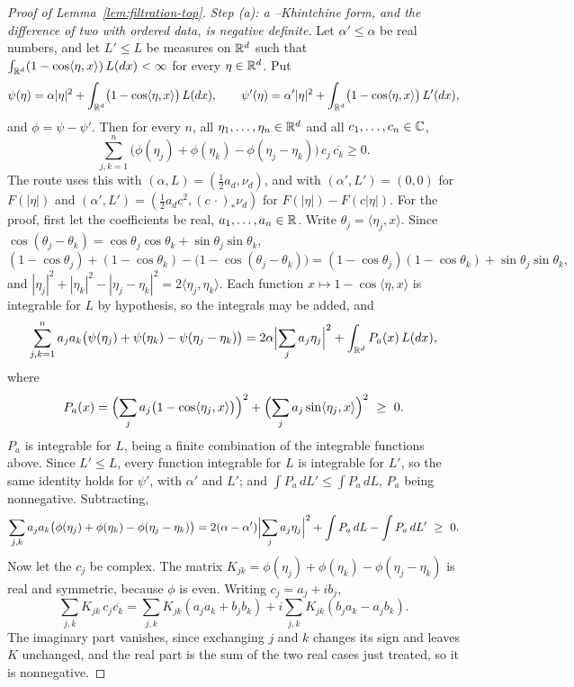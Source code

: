 \begin{proof}[Proof of Lemma~\ref{lem:filtration-top}]
\emph{Step (a): a \Levy--Khintchine form, and the difference of two with ordered data, is negative
definite.} Let $\alpha' \le \alpha$ be real numbers, and let $L' \le L$ be measures on $\mathbb{R}^d$ such
that $\int_{\mathbb{R}^d}(1 - \cos\langle\eta,x\rangle)\,L(dx) < \infty$ for every $\eta \in \mathbb{R}^d$. Put
\[
  \psi(\eta) = \alpha|\eta|^2 + \int_{\mathbb{R}^d}\bigl(1 - \cos\langle\eta,x\rangle\bigr)\,L(dx),
  \qquad
  \psi'(\eta) = \alpha'|\eta|^2 + \int_{\mathbb{R}^d}\bigl(1 - \cos\langle\eta,x\rangle\bigr)\,L'(dx),
\]
and $\phi = \psi - \psi'$. Then for every $n$, all $\eta_1, \dots, \eta_n \in \mathbb{R}^d$ and all
$c_1, \dots, c_n \in \mathbb{C}$,
\[
  \sum_{j,k=1}^n \bigl(\phi(\eta_j) + \phi(\eta_k) - \phi(\eta_j - \eta_k)\bigr)\,c_j\,\overline{c_k}
  \ge 0 .
\]
The route uses this with $(\alpha, L) = (\tfrac12 a_d, \nu_d)$, and with $(\alpha', L') = (0, 0)$
for $F(|\eta|)$ and $(\alpha', L') = (\tfrac12 a_dc^2, (c\,\cdot)_*\nu_d)$ for
$F(|\eta|) - F(c|\eta|)$. For the proof,
first let the coefficients be real, $a_1, \dots, a_n \in \mathbb{R}$. Write $\theta_j = \langle\eta_j,x\rangle$.
Since $\cos(\theta_j - \theta_k) = \cos\theta_j\cos\theta_k + \sin\theta_j\sin\theta_k$,
\[
  (1 - \cos\theta_j) + (1 - \cos\theta_k) - \bigl(1 - \cos(\theta_j - \theta_k)\bigr)
  = (1 - \cos\theta_j)(1 - \cos\theta_k) + \sin\theta_j\sin\theta_k ,
\]
and $|\eta_j|^2 + |\eta_k|^2 - |\eta_j - \eta_k|^2 = 2\langle\eta_j,\eta_k\rangle$. Each function
$x \mapsto 1 - \cos\langle\eta,x\rangle$ is integrable for $L$ by hypothesis, so the integrals may be
added, and
\[
  \sum_{j,k=1}^n a_j a_k\bigl(\psi(\eta_j) + \psi(\eta_k) - \psi(\eta_j - \eta_k)\bigr)
  = 2\alpha\Bigl|\sum_j a_j\eta_j\Bigr|^2 + \int_{\mathbb{R}^d} P_a(x)\,L(dx),
\]
where
\[
  P_a(x) = \Bigl(\sum_j a_j\bigl(1 - \cos\langle\eta_j,x\rangle\bigr)\Bigr)^2
  + \Bigl(\sum_j a_j\sin\langle\eta_j,x\rangle\Bigr)^2 \ \ge\ 0 .
\]
$P_a$ is integrable for $L$, being a finite combination of the integrable functions above. Since
$L' \le L$, every function integrable for $L$ is integrable for $L'$, so the same identity holds
for $\psi'$, with $\alpha'$ and $L'$; and $\int P_a\,dL' \le \int P_a\,dL$, $P_a$ being nonnegative.
Subtracting,
\[
  \sum_{j,k} a_j a_k\bigl(\phi(\eta_j) + \phi(\eta_k) - \phi(\eta_j - \eta_k)\bigr)
  = 2(\alpha - \alpha')\Bigl|\sum_j a_j\eta_j\Bigr|^2
  + \int P_a\,dL - \int P_a\,dL' \ \ge\ 0 .
\]
Now let the $c_j$ be complex. The matrix $K_{jk} = \phi(\eta_j) + \phi(\eta_k) - \phi(\eta_j -
\eta_k)$ is real and symmetric, because $\phi$ is even. Writing $c_j = a_j + ib_j$,
\[
  \sum_{j,k} K_{jk}\,c_j\overline{c_k}
  = \sum_{j,k} K_{jk}(a_ja_k + b_jb_k) + i\sum_{j,k} K_{jk}(b_ja_k - a_jb_k) .
\]
The imaginary part vanishes, since exchanging $j$ and $k$ changes its sign and leaves $K$ unchanged,
and the real part is the sum of the two real cases just treated, so it is nonnegative.


\end{proof}
